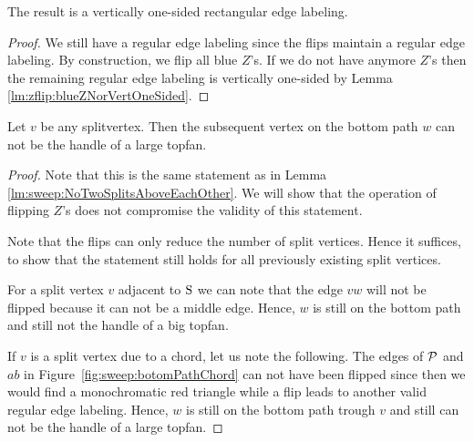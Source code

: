   \begin{lemma}
    \label{lm:sweep:vertOnsided}
    The result is a vertically one-sided rectangular edge labeling.
  \end{lemma}
  \begin{proof}
    We still have a regular edge labeling since the flips maintain a regular edge labeling.
    By construction, we flip all blue $Z$'s. If we do not have anymore $Z$'s then the remaining regular edge labeling is vertically one-sided by Lemma \ref{lm:zflip:blueZNorVertOneSided}.
  \end{proof}

  \begin{lemma}
    \label{lm:zflip:NoTwoSplitsAboveEachOtherVertOnesided}
    Let $v$ be any splitvertex. Then the subsequent vertex on the bottom path $w$ can not be the handle of a large topfan.
  \end{lemma}

  \begin{proof}
    Note that this is the same statement as in Lemma \ref{lm:sweep:NoTwoSplitsAboveEachOther}. We will show that the operation of flipping $Z$'s does not compromise the validity of this statement.

    Note that the flips can only reduce the number of split vertices.
    Hence it suffices, to show that the statement still holds for all previously existing split vertices.

    For a split vertex $v$ adjacent to $\pS$ we can note that the edge $vw$ will not be flipped because it can not be a middle edge.
    Hence, $w$ is still on the bottom path and still not the handle of a big topfan.

    If $v$ is a split vertex due to a chord, let us note the following.
    The edges of $\P$ and $ab$ in Figure~\ref{fig:sweep:botomPathChord} can not have been flipped since then we would find a monochromatic red triangle while a flip leads to another valid regular edge labeling.
    Hence, $w$ is still on the bottom path trough $v$ and still can not be the handle of a large topfan.
  \end{proof}
